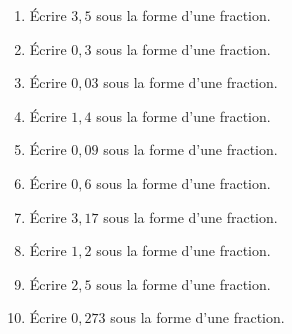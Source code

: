\documentclass[9pt]{article}
\begin{document}
\begin{multicols}{2}
\begin{exercice}
\begin{multicols}{2}
\begin{enumerate}[itemsep=2em]
	\item \begin{minipage}[t]{\linewidth} Écrire $3{,}5$ sous la forme d'une fraction. \end{minipage}
	\item \begin{minipage}[t]{\linewidth} Écrire $0{,}3$ sous la forme d'une fraction. \end{minipage}
	\item \begin{minipage}[t]{\linewidth} Écrire $0{,}03$ sous la forme d'une fraction. \end{minipage}
	\item \begin{minipage}[t]{\linewidth} Écrire $1{,}4$ sous la forme d'une fraction. \end{minipage}
	\item \begin{minipage}[t]{\linewidth} Écrire $0{,}09$ sous la forme d'une fraction. \end{minipage}
	\item \begin{minipage}[t]{\linewidth} Écrire $0{,}6$ sous la forme d'une fraction. \end{minipage}
	\item \begin{minipage}[t]{\linewidth} Écrire $3{,}17$ sous la forme d'une fraction. \end{minipage}
	\item \begin{minipage}[t]{\linewidth} Écrire $1{,}2$ sous la forme d'une fraction. \end{minipage}
	\item \begin{minipage}[t]{\linewidth} Écrire $2{,}5$ sous la forme d'une fraction. \end{minipage}
	\item \begin{minipage}[t]{\linewidth} Écrire $0{,}273$ sous la forme d'une fraction. \end{minipage}
\end{enumerate}
\end{multicols}
\end{exercice}


\end{multicols}
\end{document}
